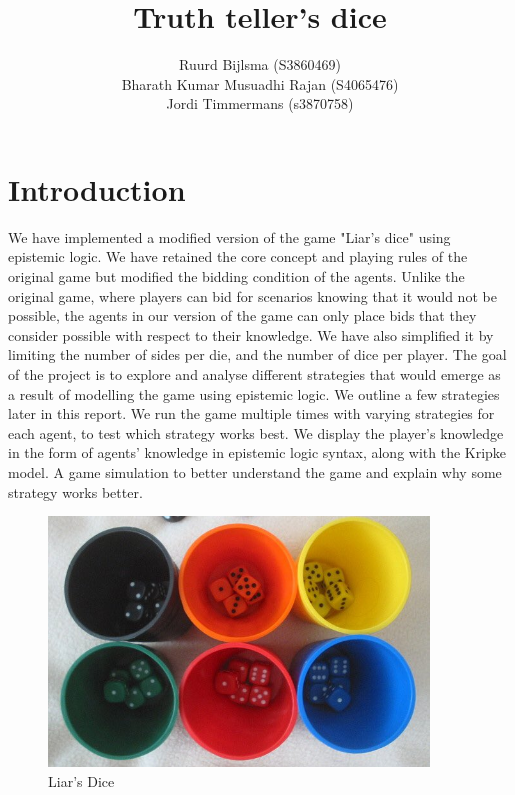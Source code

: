 \documentclass{article}
\title{Truth teller's dice}
\author{Ruurd Bijlsma (S3860469) \\
Bharath Kumar Musuadhi Rajan (S4065476) \\
Jordi Timmermans (s3870758)
}
\begin{document}
\maketitle

\section*{Introduction}

We have implemented a modified version of the game "Liar’s dice" using epistemic logic. We have retained the core concept and playing rules of the original game but modified the bidding condition of the agents. Unlike the original game, where players can bid for scenarios knowing that it would not be possible, the agents in our version of the game can only place bids that they consider possible with respect to their knowledge. We have also simplified it by limiting the number of sides per die, and the number of dice per player. The goal of the project is to explore and analyse different strategies that would emerge as a result of modelling the game using epistemic logic. We outline a few strategies later in this report. We run the game multiple times with varying strategies for each agent, to test which strategy works best. We display the player's knowledge in the form of agents' knowledge in epistemic logic syntax, along with the Kripke model. A game simulation to better understand the game and explain why some strategy works better.

\begin{figure}[h]
    \includegraphics[width=0.9\textwidth]{img/Er3haXVXEAYrp0r.jpg}
    \centering
    \caption{Liar's Dice}
    \label{fig:liarsdice}
\end{figure}
\end{document}
